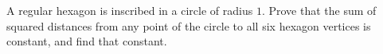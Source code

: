 A regular hexagon is inscribed in a circle of radius $1$. Prove that the sum of squared distances from any point of the circle to all six hexagon vertices is constant, and find that constant.
